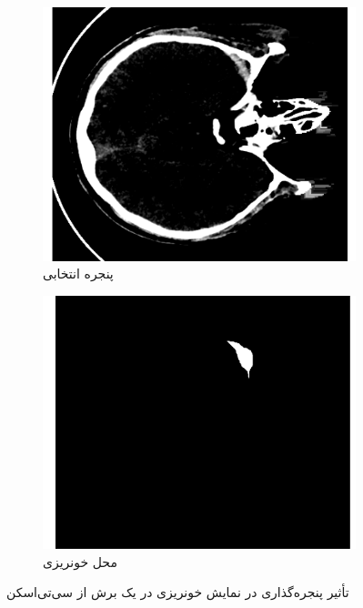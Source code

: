 \begin{figure}[h!]
\begin{subfigure}{0.33\textwidth}
    \end{subfigure}\hfil %
    \begin{subfigure}{0.33\textwidth}
      \includegraphics[width=\linewidth]{Images/chapter2/selected_window_no_caption.png}
      \caption{پنجره انتخابی}
      \label{fig:ch2-selected-window}
    \end{subfigure}\hfil %
    \begin{subfigure}{0.33\textwidth}
      \includegraphics[width=\linewidth]{Images/chapter2/bleed_location_no_caption.png}
      \caption{محل خونریزی}
      \label{fig:ch2-bleed-location}
    \end{subfigure}
\caption{تأثیر پنجره‌گذاری در نمایش خونریزی در یک برش از سی‌تی‌اسکن}
\label{fig:ch2-windowed-ct-sample}
\end{figure}

